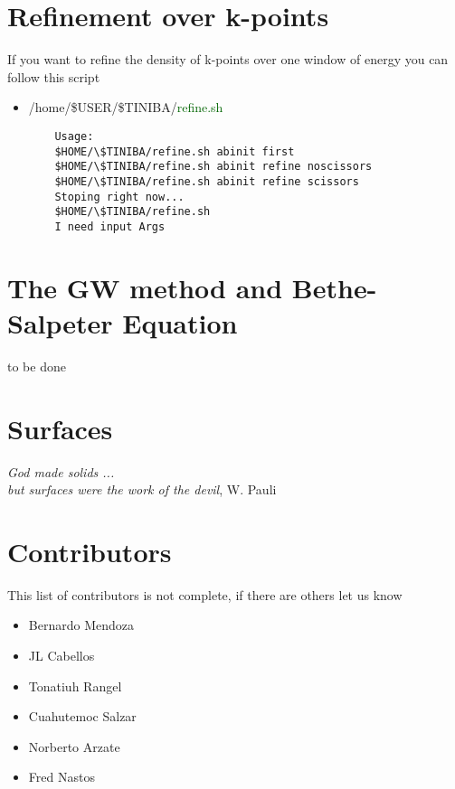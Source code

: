 \section{Refinement over k-points}
If you want to refine the density of k-points over one window of energy 
you can follow this script 
\begin{itemize}
 \item /home/\$USER/\$TINIBA/\textcolor{darkgreen}{refine.sh} 
\begin{verbatim}
    Usage:
    $HOME/\$TINIBA/refine.sh abinit first
    $HOME/\$TINIBA/refine.sh abinit refine noscissors
    $HOME/\$TINIBA/refine.sh abinit refine scissors
    Stoping right now...
    $HOME/\$TINIBA/refine.sh
    I need input Args
\end{verbatim}

\end{itemize}


\section{The GW method and Bethe-Salpeter Equation}
to be done 


\section{Surfaces }
\emph{God made solids ...\\
      but surfaces were the work of the devil}, W. Pauli\\                                  



\section{Contributors}
This list of contributors is not complete, if there are others let us know
\begin{itemize}
\item Bernardo Mendoza
\item JL Cabellos
\item Tonatiuh Rangel
\item Cuahutemoc Salzar
\item Norberto Arzate
\item Fred Nastos  
\end{itemize}
